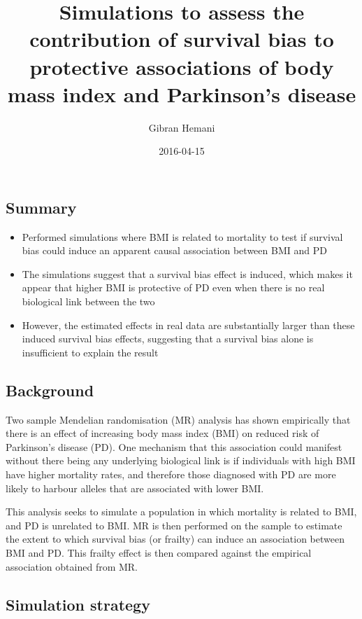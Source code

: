 \documentclass[]{article}
\title{Simulations to assess the contribution of survival bias to protective
associations of body mass index and Parkinson's disease}
\author{Gibran Hemani}
\date{2016-04-15}
\begin{document}
\maketitle


\subsection{Summary}\label{summary}

\begin{itemize}
\itemsep1pt\parskip0pt
\item
  Performed simulations where BMI is related to mortality to test if
  survival bias could induce an apparent causal association between BMI
  and PD
\item
  The simulations suggest that a survival bias effect is induced, which
  makes it appear that higher BMI is protective of PD even when there is
  no real biological link between the two
\item
  However, the estimated effects in real data are substantially larger
  than these induced survival bias effects, suggesting that a survival
  bias alone is insufficient to explain the result
\end{itemize}

\subsection{Background}\label{background}

Two sample Mendelian randomisation (MR) analysis has shown empirically
that there is an effect of increasing body mass index (BMI) on reduced
risk of Parkinson's disease (PD). One mechanism that this association
could manifest without there being any underlying biological link is if
individuals with high BMI have higher mortality rates, and therefore
those diagnosed with PD are more likely to harbour alleles that are
associated with lower BMI.

This analysis seeks to simulate a population in which mortality is
related to BMI, and PD is unrelated to BMI. MR is then performed on the
sample to estimate the extent to which survival bias (or frailty) can
induce an association between BMI and PD. This frailty effect is then
compared against the empirical association obtained from MR.

\subsection{Simulation strategy}\label{simulation-strategy}
\end{document}
